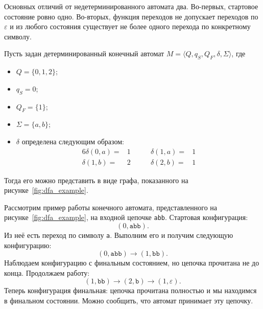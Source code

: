 Основных отличий от недетерминированного автомата два.
Во-первых, стартовое состояние ровно одно.
Во-вторых, функция переходов не допускает переходов по $\varepsilon$ и из любого состояния существует не более одного перехода по конкретному символу.

\begin{example}\label{exmpl:DFA}
    Пусть задан детерминированный конечный автомат $M=\langle Q, q_S, Q_F, \delta, \Sigma\rangle$, где
    \begin{itemize}
        \item $Q = \{0,1,2\}$;
        \item $q_S = 0$;
        \item $Q_F = \{1\}$;
        \item $\Sigma = \{a,b\}$;
        \item $\delta$ определена следующим образом:
        \begin{alignat*}{6}
            \delta(0,a) =& 1      \qquad    & \delta(1,a) =& 1 \\
            \delta(1,b) =& 2      \qquad    & \delta(2,b) =& 1
        \end{alignat*}
    \end{itemize}
    Тогда его можно представить в виде графа, показанного на рисунке~\ref{fig:dfa_example}.
    \begin{marginfigure}
        \begin{center}
            
        \end{center}
        \caption{Пример детерминированного конечного автомата в котором состояние $0$~--- стартовое, а состояние $1$~--- финальное, задающего тот же язык, что и автомат из примера~\ref{exmpl:NFA}}
        \label{fig:dfa_example}
    \end{marginfigure}

\end{example}

\begin{example}
    Рассмотрим пример работы конечного автомата, представленного на рисунке~\ref{fig:dfa_example}, на входной цепочке \texttt{abb}.
    Стартовая конфигурация:
    \[
    (0, \texttt{abb}).
    \]
    Из неё есть переход по символу \texttt{a}.
    Выполним его и получим следующую конфигурацию:
    \[
    (0, \texttt{abb}) \to (1, \texttt{bb}).
    \]
    Наблюдаем конфигурацию с финальным состоянием, но цепочка прочитана не до конца.
    Продолжаем работу:
    \[
    (1, \texttt{bb}) \to (2, \texttt{b}) \to (1, \varepsilon).
    \]
    Теперь конфигурация финальная: цепочка прочитана полностью и мы находимся в финальном состоянии.
    Можно сообщить, что автомат принимает эту цепочку.
\end{example}
